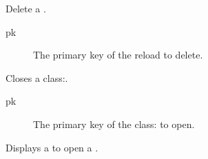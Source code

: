 \documentclass[letterpaper,10pt,english]{sphinxmanual}
\begin{document}

\begin{fulllineitems}
\label{\detokenize{modules/views:gestion.views.cancel_reload}}
Delete a {\hyperref[\detokenize{modules/models:gestion.models.Reload}]{}}.
\begin{description}
\item[{pk}] \leavevmode
The primary key of the reload to delete.

\end{description}

\end{fulllineitems}


\begin{fulllineitems}
\label{\detokenize{modules/views:gestion.views.closeDirectKeg}}
Closes a class:.
\begin{description}
\item[{pk}] \leavevmode
The primary key of the class: to open.

\end{description}

\end{fulllineitems}


\begin{fulllineitems}
\label{\detokenize{modules/views:gestion.views.closeKeg}}
Displays a {\hyperref[\detokenize{modules/forms:gestion.forms.SelectPositiveKegForm}]{}} to open a {\hyperref[\detokenize{modules/models:gestion.models.Keg}]{}}.

\end{fulllineitems}
\end{document}
